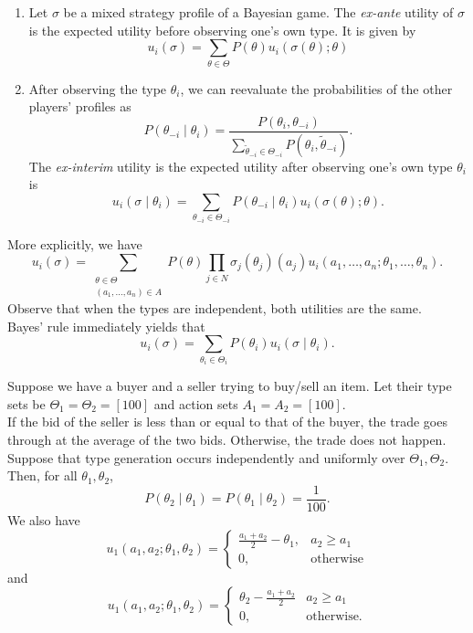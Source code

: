 	\begin{fdef}
		\begin{enumerate}
			\item Let $\sigma$ be a mixed strategy profile of a Bayesian game. The \emph{ex-ante} utility of $\sigma$ is the expected utility before observing one's own type. It is given by
			\[ u_i(\sigma) = \sum_{\theta \in \Theta} P(\theta) u_i(\sigma(\theta) ; \theta) \]
			\item After observing the type $\theta_i$, we can reevaluate the probabilities of the other players' profiles as
			\[ P(\theta_{-i} \mid \theta_i) = \frac{P(\theta_i,\theta_{-i})}{\sum_{\tilde{\theta}_{-i} \in \Theta_{-i}} P(\theta_i,\tilde{\theta}_{-i})}. \]
			The \emph{ex-interim} utility is the expected utility  after observing one's own type $\theta_i$ is
			\[ u_i(\sigma \mid \theta_i) = \sum_{\theta_{-i} \in \Theta_{-i}} P(\theta_{-i} \mid \theta_i) u_i(\sigma(\theta) ; \theta). \]
		\end{enumerate}
	\end{fdef}

	More explicitly, we have
	\[ u_i(\sigma) = \sum_{\substack{\theta \in \Theta \\ (a_1,\ldots,a_n) \in A}} P(\theta) \prod_{j \in N} \sigma_j(\theta_j)(a_j) u_i(a_1,\ldots,a_n ; \theta_1,\ldots,\theta_n). \]
	Observe that when the types are independent, both utilities are the same.\\

	Bayes' rule immediately yields that
	\[ u_i(\sigma) = \sum_{\theta_i \in \Theta_i} P(\theta_i) u_i(\sigma \mid \theta_i). \]

	\begin{fex}
		Suppose we have a buyer and a seller trying to buy/sell an item. Let their type sets be $\Theta_1 = \Theta_2 = [100]$ and action sets $A_1 = A_2 = [100]$.\\
		If the bid of the seller is less than or equal to that of the buyer, the trade goes through at the average of the two bids. Otherwise, the trade does not happen.\\
		Suppose that type generation occurs independently and uniformly over $\Theta_1,\Theta_2$. Then, for all $\theta_1,\theta_2$,
		\[ P(\theta_2 \mid \theta_1) = P(\theta_1 \mid \theta_2) = \frac{1}{100}. \]
		We also have
		\[ u_1(a_1,a_2;\theta_1,\theta_2) = \begin{cases} \frac{a_1+a_2}{2} - \theta_1, & a_2 \ge a_1 \\ 0, & \text{otherwise} \end{cases} \]
		and
		\[ u_1(a_1,a_2;\theta_1,\theta_2) = \begin{cases} \theta_2 - \frac{a_1+a_2}{2} & a_2 \ge a_1 \\ 0, & \text{otherwise.} \end{cases} \]
	\end{fex}


